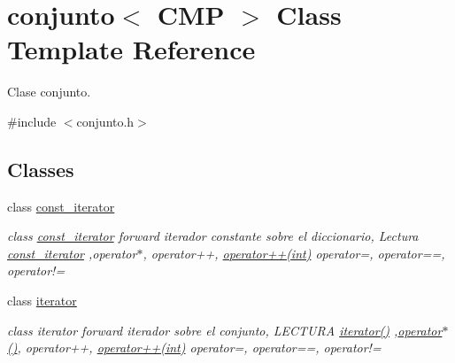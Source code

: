 \hypertarget{classconjunto}{\section{conjunto$<$ C\-M\-P $>$ Class Template Reference}
\label{classconjunto}
}


Clase conjunto.  




{\ttfamily \#include $<$conjunto.\-h$>$}

\subsection*{Classes}
\begin{DoxyCompactItemize}
\item 
class \hyperlink{classconjunto_1_1const__iterator}{const\-\_\-iterator}
\begin{DoxyCompactList}\small\item\em class \hyperlink{classconjunto_1_1const__iterator}{const\-\_\-iterator} forward iterador constante sobre el diccionario, Lectura \hyperlink{classconjunto_1_1const__iterator}{const\-\_\-iterator} ,operator$\ast$, operator++, \hyperlink{classconjunto_1_1const__iterator_a9ab281204402103f6d674986eb63f80d}{operator++(int)} operator=, operator==, operator!= \end{DoxyCompactList}\item 
class \hyperlink{classconjunto_1_1iterator}{iterator}
\begin{DoxyCompactList}\small\item\em class iterator forward iterador sobre el conjunto, L\-E\-C\-T\-U\-R\-A \hyperlink{classconjunto_1_1iterator_a3f22236830d397ec750b795e4358492d}{iterator()} ,\hyperlink{classconjunto_1_1iterator_a0c53f65ff17cb959685cf42128da0520}{operator$\ast$()}, operator++, \hyperlink{classconjunto_1_1iterator_aaa2face7f36e8940595dc6f0e1159865}{operator++(int)} operator=, operator==, operator!= \end{DoxyCompactList}\end{DoxyCompactItemize}
